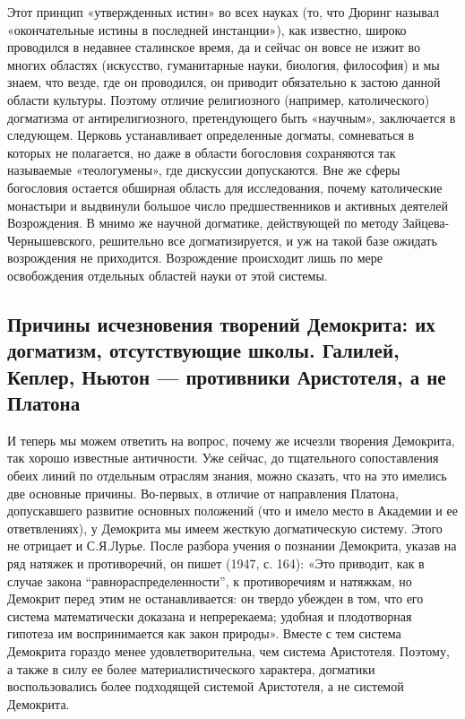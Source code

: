 Этот принцип «утвержденных истин» во всех науках (то, что Дюринг
называл «окончательные истины в последней инстанции»), как известно,
широко проводился в недавнее сталинское время, да и сейчас он вовсе не
изжит во многих областях (искусство, гуманитарные науки, биология,
философия) и мы знаем, что везде, где он проводился, он приводит
обязательно к застою данной области культуры. Поэтому отличие
религиозного (например, католического) догматизма от антирелигиозного,
претендующего быть «научным», заключается в следующем. Церковь
устанавливает определенные догматы, сомневаться в которых не
полагается, но даже в области богословия сохраняются так называемые
«теологумены», где дискуссии допускаются. Вне же сферы богословия
остается обширная область для исследования, почему католические
монастыри и выдвинули большое число предшественников и активных
деятелей Возрождения. В мнимо же научной догматике, действующей по
методу Зайцева-Чернышевского, решительно все догматизируется, и уж на
такой базе ожидать возрождения не приходится. Возрождение происходит
лишь по мере освобождения отдельных областей науки от этой системы.

\subsection{Причины исчезновения творений Демокрита: их догматизм,
отсутствующие школы. Галилей, Кеплер, Ньютон --- противники
Аристотеля, а не Платона}

И теперь мы можем ответить на вопрос, почему же исчезли творения
Демокрита, так хорошо известные античности. Уже сейчас, до тщательного
сопоставления обеих линий по отдельным отраслям знания, можно сказать,
что на это имелись две основные причины. Во-первых, в отличие от
направления Платона, допускавшего развитие основных положений (что и
имело место в Академии и ее ответвлениях), у Демокрита мы имеем
жесткую догматическую систему. Этого не отрицает и С.Я.Лурье. После
разбора учения о познании Демокрита, указав на ряд натяжек и
противоречий, он пишет (1947, с. 164): «Это приводит, как в случае
закона ``равнораспределенности'', к противоречиям и натяжкам, но
Демокрит перед этим не останавливается: он твердо убежден в том, что
его система математически доказана и непререкаема; удобная и
плодотворная гипотеза им воспринимается как закон природы». Вместе с
тем система Демокрита гораздо менее удовлетворительна, чем система
Аристотеля. Поэтому, а также в силу ее более материалистического
характера, догматики воспользовались более подходящей системой
Аристотеля, а не системой Демокрита.

